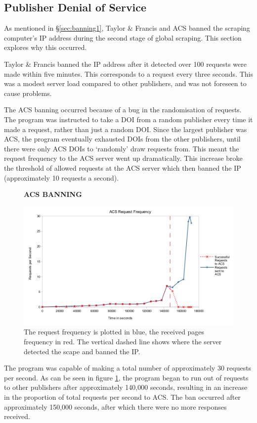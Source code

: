 \subsection{Publisher Denial of Service}
\label{sec:banning2}
As mentioned in \S\ref{sec:banning1}, Taylor \& Francis and ACS banned the scraping computer's IP address during the second stage of global scraping. This section explores why this occurred.

Taylor \& Francis banned the IP address after it detected over 100 requests were made within five minutes. This corresponds to a request every three seconds. This was a modest server load compared to other publishers, and was not foreseen to cause problems.

The ACS banning occurred because of a bug in the randomisation of requests. The program was instructed to take a DOI from a random publisher every time it made a request, rather than just a random DOI. Since the largest publisher was ACS, the program eventually exhausted DOIs from the other publishers, until there were only ACS DOIs to `randomly' draw requests from. This meant the request frequency to the ACS server went up dramatically. This increase broke the threshold of allowed requests at the ACS server which then banned the IP (approximately 10 requests a second).

\begin{figure}[H]
    \centering
    \textbf{ACS BANNING}\par\medskip
    \includegraphics[width=\textwidth]{Data_Acquisition/ACS_crash_line.png}
    \caption[Request Frequency Leading to ACS Ban]{The request frequency is plotted in blue, the received pages frequency in red. The vertical dashed line shows where the server detected the scape and banned the IP.}
     \label{fig:ACSBAN}
\end{figure}
The program was capable of making a total number of approximately 30 requests per second. As can be seen in figure \ref{fig:ACSBAN}, the program began to run out of requests to other publishers after approximately 140,000 seconds, resulting in an increase in the proportion of total requests per second to ACS. The ban occurred after approximately 150,000 seconds, after which there were no more responses received.


